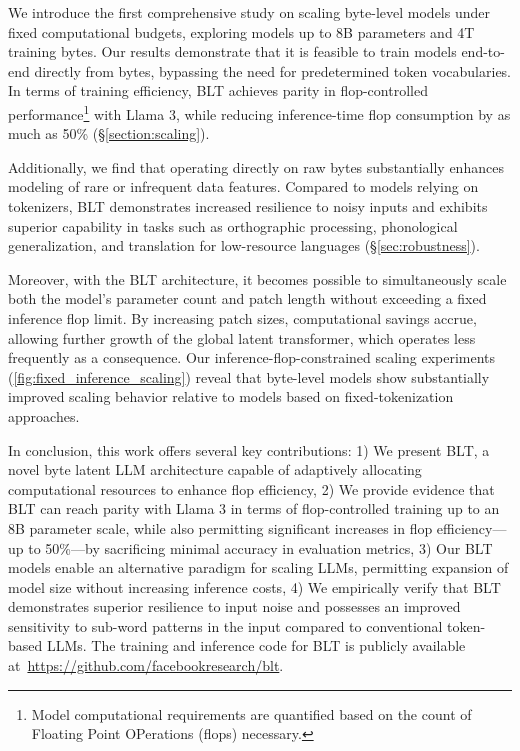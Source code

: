 We introduce the first comprehensive study on scaling byte-level models under fixed computational budgets, exploring models up to 8B parameters and 4T training bytes. Our results demonstrate that it is feasible to train models end-to-end directly from bytes, bypassing the need for predetermined token vocabularies. In terms of training efficiency, {\textsc BLT} achieves parity in flop-controlled performance\footnote{Model computational requirements are quantified based on the count of Floating Point OPerations (flops) necessary.} with Llama 3, while reducing inference-time flop consumption by as much as 50\% (\S\ref{section:scaling}).

Additionally, we find that operating directly on raw bytes substantially enhances modeling of rare or infrequent data features. Compared to models relying on tokenizers, {\textsc BLT} demonstrates increased resilience to noisy inputs and exhibits superior capability in tasks such as orthographic processing, phonological generalization, and translation for low-resource languages (\S\ref{sec:robustness}).

Moreover, with the {\textsc BLT} architecture, it becomes possible to simultaneously scale both the model's parameter count and patch length without exceeding a fixed inference flop limit. By increasing patch sizes, computational savings accrue, allowing further growth of the global latent transformer, which operates less frequently as a consequence. Our inference-flop-constrained scaling experiments (\autoref{fig:fixed_inference_scaling}) reveal that byte-level models show substantially improved scaling behavior relative to models based on fixed-tokenization approaches.

In conclusion, this work offers several key contributions: 1) We present {\textsc BLT}, a novel byte latent LLM architecture capable of adaptively allocating computational resources to enhance flop efficiency, 2) We provide evidence that {\textsc BLT} can reach parity with Llama 3 in terms of flop-controlled training up to an 8B parameter scale, while also permitting significant increases in flop efficiency—up to 50\%—by sacrificing minimal accuracy in evaluation metrics, 3) Our {\textsc BLT} models enable an alternative paradigm for scaling LLMs, permitting expansion of model size without increasing inference costs, 4) We empirically verify that {\textsc BLT} demonstrates superior resilience to input noise and possesses an improved sensitivity to sub-word patterns in the input compared to conventional token-based LLMs. The training and inference code for {\textsc BLT} is publicly available at~\url{https://github.com/facebookresearch/blt}.

